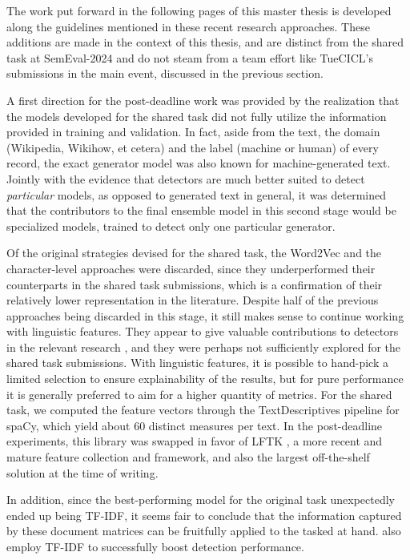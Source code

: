 The work put forward in the following pages of this master thesis is developed along the guidelines mentioned in these recent research approaches.
These additions are made in the context of this thesis, and are distinct from the shared task at SemEval-2024 and do not steam from a team effort like TueCICL's submissions in the main event, discussed in the previous section.

A first direction for the post-deadline work was provided by the realization that the models developed for the shared task did not fully utilize the information provided in training and validation.
In fact, aside from the text, the domain (Wikipedia, Wikihow, et cetera) and the label (machine or human) of every record, the exact generator model was also known for machine-generated text.
Jointly with the evidence that detectors are much better suited to detect \emph{particular} models, as opposed to generated text in general, it was determined that the contributors to the final ensemble model in this second stage would be specialized models, trained to detect only one particular generator.

Of the original strategies devised for the shared task, the Word2Vec and the character-level approaches were discarded, since they underperformed their counterparts in the shared task submissions, which is a confirmation of their relatively lower representation in the literature.
Despite half of the previous approaches being discarded in this stage, it still makes sense to continue working with linguistic features.
They appear to give valuable contributions to detectors in the relevant research \citep{frohling2021feature}, and they were perhaps not sufficiently explored for the shared task submissions.
With linguistic features, it is possible to hand-pick a limited selection to ensure explainability of the results, but for pure performance it is generally preferred to aim for a higher quantity of metrics.
For the shared task, we computed the feature vectors through the TextDescriptives pipeline \citep{Hansen_2023} for spaCy, which yield about 60 distinct measures per text.
In the post-deadline experiments, this library was swapped in favor of LFTK \citep{lee2023lftkhandcraftedfeaturescomputational}, a more recent and mature feature collection and framework, and also the largest off-the-shelf solution at the time of writing.

In addition, since the best-performing model for the original task unexpectedly ended up being TF-IDF, it seems fair to conclude that the information captured by these document matrices can be fruitfully applied to the tasked at hand.
\citet{frohling2021feature} also employ TF-IDF to successfully boost detection performance.


